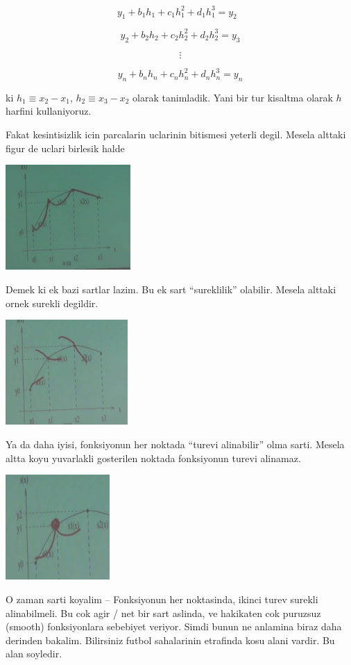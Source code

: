 \documentclass[12pt,fleqn]{article}\usepackage{common}
\begin{document}
\[ y_1 + b_1h_1 + c_1h_1^2 + d_1h_1^3 = y_2 \ \ \ \label{2} \]

\[ y_2 + b_2h_2 + c_2h_2^2 + d_2h_2^3 = y_3 \]

\[ \vdots \]

\[ y_n + b_nh_n + c_nh_n^2 + d_nh_n^3 = y_n \]

ki $h_1 \equiv x_2 - x_1$, $h_2 \equiv x_3 - x_2$ olarak tanimladik. Yani bir tur kisaltma 
olarak $h$ harfini kullaniyoruz. 

Fakat kesintisizlik icin parcalarin uclarinin bitismesi yeterli
degil. Mesela alttaki figur de uclari birlesik halde

\includegraphics[height=4cm]{spline3.png}

Demek ki ek bazi sartlar lazim. Bu ek sart ``sureklilik'' olabilir. Mesela
alttaki ornek surekli degildir.

\includegraphics[height=4cm]{spline5.png}

Ya da daha iyisi, fonksiyonun her noktada ``turevi alinabilir'' olma
sarti. Mesela altta koyu yuvarlakli gosterilen noktada fonksiyonun turevi
alinamaz.

\includegraphics[height=4cm]{spline4.png}

O zaman sarti koyalim -- Fonksiyonun her noktasinda, ikinci turev surekli
alinabilmeli. Bu cok agir / net bir sart aslinda, ve hakikaten cok puruzsuz
(smooth) fonksiyonlara sebebiyet veriyor. Simdi bunun ne anlamina biraz
daha derinden bakalim. Bilirsiniz futbol sahalarinin etrafinda kosu alani
vardir. Bu alan soyledir.
\end{document}
